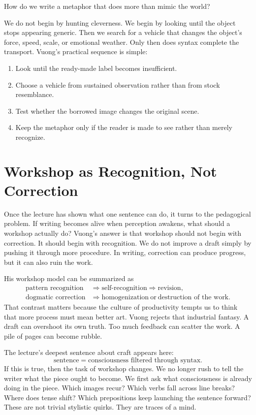 How do we write a metaphor that does more than mimic the world?

We do not begin by hunting cleverness. We begin by looking until the object stops appearing generic. Then we search for a vehicle that changes the object's force, speed, scale, or emotional weather. Only then does syntax complete the transport. Vuong's practical sequence is simple:
\begin{enumerate}
\item Look until the ready-made label becomes insufficient.
\item Choose a vehicle from sustained observation rather than from stock resemblance.
\item Test whether the borrowed image changes the original scene.
\item Keep the metaphor only if the reader is made to see rather than merely recognize.
\end{enumerate}

\section{Workshop as Recognition, Not Correction}

Once the lecture has shown what one sentence can do, it turns to the pedagogical problem. If writing becomes alive when perception awakens, what should a workshop actually do? Vuong's answer is that workshop should not begin with correction. It should begin with recognition. We do not improve a draft simply by pushing it through more procedure. In writing, correction can produce progress, but it can also ruin the work.

His workshop model can be summarized as
\begin{align}
\text{pattern recognition} &\Longrightarrow \text{self-recognition} \Longrightarrow \text{revision},\\
\text{dogmatic correction} &\Longrightarrow \text{homogenization} \ \text{or} \ \text{destruction of the work}.
\end{align}
That contrast matters because the culture of productivity tempts us to think that more process must mean better art. Vuong rejects that industrial fantasy. A draft can overshoot its own truth. Too much feedback can scatter the work. A pile of pages can become rubble.

The lecture's deepest sentence about craft appears here:
\begin{equation}
\text{sentence} = \text{consciousness filtered through syntax}.
\end{equation}
If this is true, then the task of workshop changes. We no longer rush to tell the writer what the piece ought to become. We first ask what consciousness is already doing in the piece. Which images recur? Which verbs fall across line breaks? Where does tense shift? Which prepositions keep launching the sentence forward? These are not trivial stylistic quirks. They are traces of a mind.

